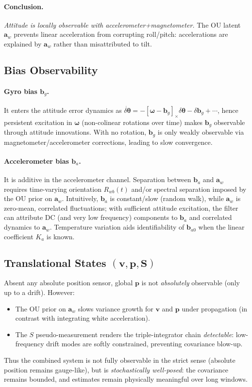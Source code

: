 \documentclass[10pt]{extarticle}
\begin{document}
\paragraph{Conclusion.} \emph{Attitude is locally observable with accelerometer+magnetometer.}
The OU latent $\bm a_w$ prevents linear acceleration from corrupting roll/pitch:
accelerations are explained by $\bm a_w$ rather than misattributed to tilt.

\subsection{Bias Observability}
\paragraph{Gyro bias $\bm b_g$.} It enters the attitude error dynamics as 
$\dot{\delta\bm\theta}=-[\bm\omega-\bm b_g]_\times\delta\bm\theta - \delta\bm b_g + \cdots$,
hence persistent excitation in $\bm\omega$ (non-colinear rotations over time) makes
$\bm b_g$ observable through attitude innovations. With no rotation, $\bm b_g$ is only
weakly observable via magnetometer/accelerometer corrections, leading to slow convergence.

\paragraph{Accelerometer bias $\bm b_a$.} It is additive in the accelerometer channel.
Separation between $\bm b_a$ and $\bm a_w$ requires time-varying orientation $R_{wb}(t)$
and/or spectral separation imposed by the OU prior on $\bm a_w$. Intuitively, $\bm b_a$
is constant/slow (random walk), while $\bm a_w$ is zero-mean, correlated fluctuations;
with sufficient attitude excitation, the filter can attribute DC (and very low frequency)
components to $\bm b_a$ and correlated dynamics to $\bm a_w$. Temperature variation aids
identifiability of $\bm b_{a0}$ when the linear coefficient $K_a$ is known.

\subsection{Translational States \texorpdfstring{$(\bm v,\bm p,\bm S)$}{plain-text}}
Absent any absolute position sensor, global $\bm p$ is not \emph{absolutely} observable
(only up to a drift). However:
\begin{itemize}
\item The OU prior on $\bm a_w$ slows variance growth for $\bm v$ and $\bm p$
under propagation (in contrast with integrating white acceleration).
\item The $S$ pseudo-measurement renders the triple-integrator chain \emph{detectable}:
low-frequency drift modes are softly constrained, preventing covariance blow-up.
\end{itemize}
Thus the combined system is not fully observable in the strict sense (absolute position
remains gauge-like), but is \emph{stochastically well-posed}: the covariance remains bounded,
and estimates remain physically meaningful over long windows.
\end{document}
